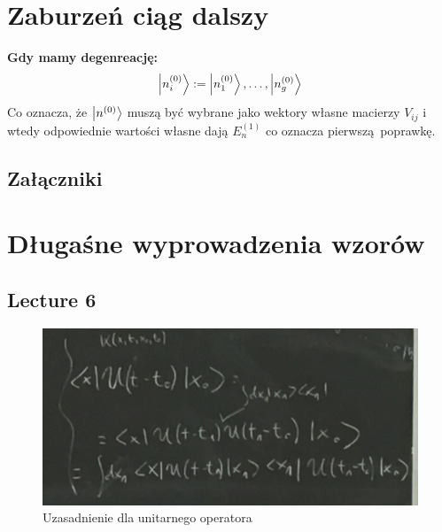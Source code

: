 \documentclass[12pt,a4paper]{report}
\renewcommand{\emph}{\textbf}
\newenvironment{lecture}[1]{\par\medskip
   \noindent\chapter{#1} \rmfamily}{\medskip}
\begin{document}
\begin{lecture}{Zaburzeń ciąg dalszy}
    \emph{Gdy mamy degenreację:}\\
    \[
        \ket{n_i^{(0)}} := \ket{n_1^{(0)}},\dots,\ket{n_g^{(0)}}  
    \]
    Co oznacza, że $\ket{n^{(0)}}$ muszą być wybrane jako wektory własne macierzy $V_{ij}$ i wtedy odpowiednie wartości własne dają $E_n^{(1)}$ co oznacza pierwszą poprawkę.
\end{lecture}


\tableofcontents

\listoffigures

\printindex

\begin{center}
    \chapter*{Załączniki}
\end{center}

\appendix
\setcounter{table}{0}
\captionsetup[table]{name=Załącznik}
\captionsetup[figure]{name=Wyprowadzenie}
\captionsetup[section]{name=Lecture}

\chapter{Długaśne wyprowadzenia wzorów}

\section{Lecture 6}

\begin{figure}[!ht]
        \centering
        \includegraphics[width=\linewidth]{App_6_Rys_1.JPG}
        \caption{Uzasadnienie dla unitarnego operatora}
        \label{fig:app_6:unitarny}
\end{figure}
\end{document}
